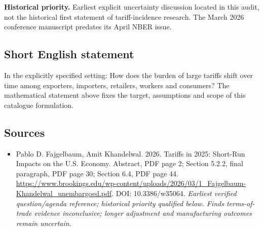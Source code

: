 \documentclass[11pt]{article}
\begin{document}
\par\textbf{Historical priority.} Earliest explicit uncertainty discussion located in this audit, not the historical first statement of tariff-incidence research. The March 2026 conference manuscript predates its April NBER issue.

\subsection{Short English statement}
In the explicitly specified setting: How does the burden of large tariffs shift over time among exporters, importers, retailers, workers and consumers? The mathematical statement above fixes the target, assumptions and scope of this catalogue formulation.

\subsection{Sources}
\begin{itemize}\raggedright
\item[\textnormal{[S1]}]\hypertarget{source:30007624:1}{} Pablo D. Fajgelbaum, Amit Khandelwal. 2026. Tariffs in 2025: Short-Run Impacts on the U.S. Economy. Abstract, PDF page 2; Section 5.2.2, final paragraph, PDF page 30; Section 6.4, PDF page 44.
\url{https://www.brookings.edu/wp-content/uploads/2026/03/1_Fajgelbaum-Khandelwal_unembargoed.pdf}.
DOI: 10.3386/w35064.
{\small\textit{Earliest verified question/agenda reference; historical priority qualified below. Finds terms-of-trade evidence inconclusive; longer adjustment and manufacturing outcomes remain uncertain.}}
\end{itemize}
\end{document}
